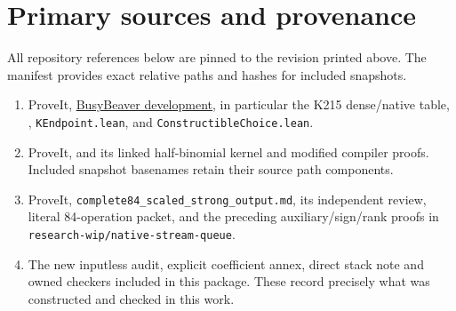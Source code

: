 \documentclass[11pt]{article}
\begin{document}
\section*{Primary sources and provenance}
All repository references below are pinned to the revision printed above. The manifest provides exact relative paths and hashes for included snapshots.
\begin{enumerate}
\item ProveIt, \href{https://github.com/VladimirReshetnikov/ProveIt/tree/cdd582bec13f908df3711fa9e05d1ddac368a5db/Computability/BusyBeaver}{BusyBeaver development}, in particular the K215 dense/native table, , \texttt{KEndpoint.lean}, and \texttt{ConstructibleChoice.lean}.
\item ProveIt,  and its linked half-binomial kernel and modified compiler proofs. Included snapshot basenames retain their source path components.
\item ProveIt, \texttt{complete84\_scaled\_strong\_output.md}, its independent review, literal 84-operation packet, and the preceding auxiliary/sign/rank proofs in \texttt{research-wip/native-stream-queue}.
\item The new inputless audit, explicit coefficient annex, direct stack note and owned checkers included in this package. These record precisely what was constructed and checked in this work.
\end{enumerate}
\end{document}
